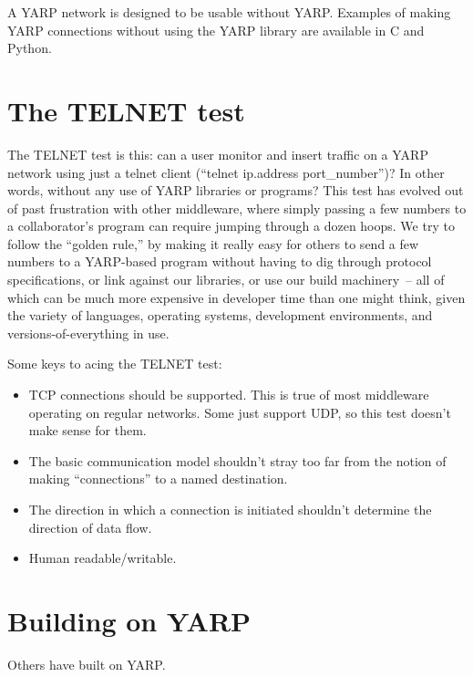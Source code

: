 \documentclass[letterpaper]{article}
\begin{document}
A YARP network is designed to be usable without YARP.  Examples of
making YARP connections without using the YARP library are available
in C and Python.


\section{The TELNET test}

The TELNET test is this: can a user monitor and insert traffic on a
YARP network using just a telnet client (``telnet ip.address
port\_number'')?  In other words, without any use of YARP libraries or
programs?  This test has evolved out of past frustration with other
middleware, where simply passing a few numbers to a collaborator's
program can require jumping through a dozen hoops.  We try to follow
the ``golden rule,'' by making it really easy for others to send a few
numbers to a YARP-based program without having to dig through protocol
specifications, or link against our libraries, or use our build
machinery~-- all of which can be much more expensive in developer time
than one might think, given the variety of languages, operating
systems, development environments, and versions-of-everything in use.

Some keys to acing the TELNET test:

\begin{itemize}

\item TCP connections should be supported.  
  This is true of most middleware operating on regular
  networks. Some just support UDP, so this test doesn't
  make sense for them.

\item The basic communication model shouldn't stray too far from the
  notion of making ``connections'' to a named destination.

\item The direction in which a connection is initiated shouldn't
  determine the direction of data flow.

\item Human readable/writable.

\end{itemize}


\section{Building on YARP}

Others have built on YARP.
\end{document}
